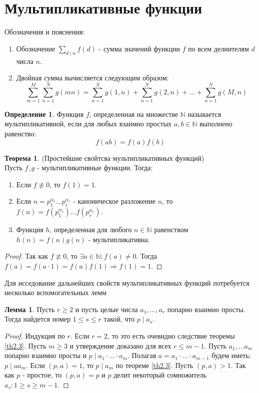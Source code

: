 \documentclass[a4paper, 12pt]{article}
\newcommand{\N}{\mathbb{N}}
\renewcommand{\div}{\mid}
\theoremstyle{definition}
\newtheorem{definition}{Определение}[section]
\newtheorem{theorem}{Теорема}[section]
\newtheorem{lemma}{Лемма}[section]
\begin{document}
    \section{Мультипликативные функции}
    Обозначения и пояснения:
    \begin{enumerate}
        \item Обозначение $\sum\limits_{d\div n}f(d)$ - сумма значений функции $f$ по всем делиителям $d$ числа $n$.
        \item Двойная сумма вычисляется следующим образом: \[\sum\limits_{m=1}^M\sum\limits_{n=1}^Ng(mn)=\sum\limits_{n=1}^Ng(1,n)+\sum\limits_{n=1}^Ng(2,n)+\dots +\sum\limits_{n=1}^Ng(M,n)\]
    \end{enumerate}
    \begin{definition}
        Функция $f$, определенная на множестве $\N$ называется мультипликативной, если для любых взаимно простых $a,b\in \N$ выполнено равенство:
        $$f(ab)=f(a)f(b)$$
    \end{definition}
    \begin{theorem}(Простейшие свойтсва мультипликативных функций) \label{th6.1}\\
        Пусть $f,g$ - мультипликативные функции. Тогда:
        \begin{enumerate}
            \item Если $f\not\equiv 0$, то $f(1)=1$.
            \item Если $n=p_1^{\alpha_1}\dots p_r^{\alpha_r}$ - каноническое разложение $n$, то $f(n)=f(p_1^{\alpha_1})\dots f(p_r^{\alpha_r})$.
            \item Функция $h$, определенная для любого $n\in \N$ равенством\\ $h(n)=f(n)g(n)$ - мультипликативна. 
        \end{enumerate}
        \begin{proof}
            Так как $f\not\equiv 0$, то $\exists a\in \N: f(a)\ne 0$. Тогда\\ $f(a)=f(a\cdot 1)=f(a)f(1) \Rightarrow f(1)=1$.
        \end{proof}
    \end{theorem}
    Для исседование дальнейших свойств мультипликативных функций потребуется несколько вспомогательных лемм
    \begin{lemma} \label{lemma6.1}
        Пусть $r\geq 2$ и пусть целые числа $a_1,\dots, a_r$ попарно взаимно просты. Тогда найдется номер $1\leq s\leq r$ такой, что $p\div a_s$.
    \end{lemma} 
    \begin{proof}
        Индукция по $r$. Если $r=2$, то это есть очевидно следствие теоремы \ref{th2.3}. Пусть $m\geq 3$ и утверждение доказано для всех $r\leq m-1$. Пусть $a_1,\dots a_m$ попарно взаимно просты и $p \div a_1\cdot...\cdot a_m$. Полагая $a=a_1\cdot ... \cdot a_{m-1}$ будем иметь: $p \div aa_m$. Если $(p,a)=1$, то $p\div a_m$ по теореме \ref{th2.3}. Пусть $(p,a)>1$. Так как $p$ - простое, то $(p,a)=p$ и $p$ делит некоторый сомножитель $a_{s}: 1 \geq s \geq m-1$.
    \end{proof} 
\end{document}
